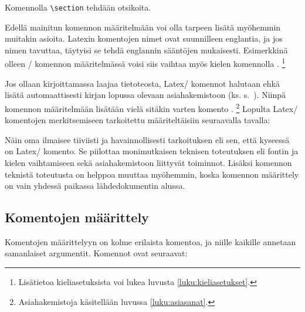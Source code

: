 \begin{tulossis}
  Komennolla \texttt{\textbackslash section} tehdään otsikoita.
\end{tulossis}

Edellä mainitun komennon määritelmään voi olla tarpeen lisätä myöhemmin
muitakin asioita. Latexin komentojen nimet ovat suunnilleen englantia,
ja jos nimen tavuttaa, täytyisi se tehdä englannin sääntöjen mukaisesti.
Esimerkkinä olleen \-/ komennon määritelmässä voisi
siis vaihtaa myös kielen komennolla .%
\footnote{Lisätietoa kieliasetuksista voi lukea luvusta
  \ref{luku:kieliasetukset}.}

Jos ollaan kirjoittamassa laajaa tietoteosta, Latex\-/ komennot halutaan
ehkä lisätä automaattisesti kirjan lopussa olevaan asiahakemistoon (ks.
s.~\pageref{luku:asiahakemisto}). Niinpä komennon määritelmään lisätään
vielä sitäkin varten komento .%
\footnote{Asiahakemistoja käsitellään luvussa \ref{luku:asiasanat}.}
Lopulta Latex\-/ komentojen merkitsemiseen tarkoitettu
 määriteltäisiin seuraavalla tavalla:

\begin{koodilohkosis}
\newcommand{\komento}[1]{%
  \texttt{\textbackslash\textenglish{#1}}%
  \index[komennot]{\texttt{\textbackslash #1}}}
\end{koodilohkosis}

Näin oma  ilmaisee tiiviisti ja havainnollisesti
tarkoituksen eli sen, että kyseessä on Latex\-/ komento. Se piilottaa
monimutkaisen teknisen toteutuksen eli fontin ja kielen vaihtamiseen
sekä asiahakemistoon liittyvät toiminnot. Lisäksi komennon teknistä
toteutusta on helppoa muuttaa myöhemmin, koska komennon määrittely on
vain yhdessä paikassa lähdedokumentin alussa.

\subsection{Komentojen määrittely}
\label{luku:komennot_maarittely}

Komentojen määrittelyyn on kolme erilaista komentoa, ja niille kaikille
annetaan samanlaiset argumentit. Komennot ovat seuraavat:

\begin{koodilohkosis}
\newcommand     {\nimi}[n][oletus]{määritelmä}
\renewcommand   {\nimi}[n][oletus]{määritelmä}
\providecommand {\nimi}[n][oletus]{määritelmä}
\end{koodilohkosis}

